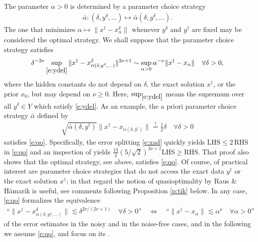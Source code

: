 \documentclass[10pt, a4paper]{iopart}
\newcommand{\norm}[2]{     \| #1       \|_{ #2 }}
\theoremstyle{remark}
\theoremstyle{definition}
\newcommand{\TODO}[1]{\textrm{\color{red}TODO: #1}}
\providecommand{\REV}[1]{{#1}}
\begin{document}
The parameter $\alpha > 0$ is determined by
a parameter choice strategy
\begin{align}
\label{e:pcs}
	\bar{\alpha} : 
	(\delta, y^\delta, \ldots) \mapsto \bar{\alpha}(\delta, y^\delta, \ldots)
	.
\end{align}
%
The one that minimizes 
$\alpha \mapsto \norm{x^\dag - x_\alpha^\delta}{}$
whenever $y^\delta$ and $y^\dag$ are fixed
may be considered the optimal strategy.
%
We shall suppose that
the parameter choice strategy 
satisfies
\begin{align}
\label{e:qo}
	\delta^{-2\nu}
	\sup_{{{\eqref{e:ydel}}}}
	\norm{x^\dag - x_{\bar{\alpha}(\delta, y^\delta, \ldots)}^\delta}{}^{2\nu + 1}
	\sim
	\sup_{\alpha > 0}
	\alpha^{-\nu}
	\norm{x^\dag - x_{\alpha}}{}
	\quad
	\forall
	\delta > 0
	,
\end{align}
where the hidden constants 
do not depend on $\delta$, the exact solution $x^\dag$, or the prior $x_0$,
but may depend on $\nu \geq 0$.
%
Here, $\sup_{{{\eqref{e:ydel}}}}$
means the supremum over all $y^\delta \in Y$
which satisfy \eqref{e:ydel}.
%
As an example,
the a priori parameter choice strategy
$\bar{\alpha}$
defined by
\begin{align}
\label{e:pcs1}
	\sqrt{\bar{\alpha}(\delta, y^\dag)}
	\norm{ x^\dag - x_{\bar{\alpha}(\delta, y^\dag)} }{}
	\stackrel{{!}}{=}
	\tfrac12
	\delta
	\quad
	\forall \delta > 0
\end{align}
satisfies \eqref{e:qo}.
%
Specifically, 
the error splitting
\eqref{e:xad} quickly yields
$\text{LHS} \leq 2 \, \text{RHS}$ in \eqref{e:qo}
and
an inspection of
\cite[Proof of Theorem 2.6]{Neubauer1997}
yields
$\frac{13}{2} (5 / \sqrt{2})^{2 \nu + 1} \text{LHS} \geq \text{RHS}$.
%
That proof
also shows that the optimal strategy, see above,
satisfies \eqref{e:qo}.
%
Of course, of practical interest are 
parameter choice strategies
that do not access 
the exact data $y^\dag$ or the exact solution $x^\dag$;
\REV{%
in that regard 
the notion 
of quasioptimality by Raus \& H\"amarik \cite{RausHamarik2007}
is useful,
see comments following Proposition \ref{p:tik} below.
}%
%
%
In any case, 
\eqref{e:qo} formalizes
the equivalence
\begin{align}
	\text{``}
		\norm{ x^\dag - x_{\bar{\alpha}(\delta, y^\delta, \ldots)}^\delta }{}
		\lesssim
		\delta^{2 \nu / (2 \nu + 1)}
		\quad
		\forall \delta > 0
	\text{''}
	\quad\Leftrightarrow\quad
	\text{``}
		\norm{x^\dag - x_\alpha}{}
		\lesssim
		\alpha^\nu
		\quad
		\forall \alpha > 0
	\text{''}
\end{align}
of the error estimates 
in the noisy and in the noise-free 
cases,
and
in the following we assume \eqref{e:qo},
and focus on its .
%
\end{document}
